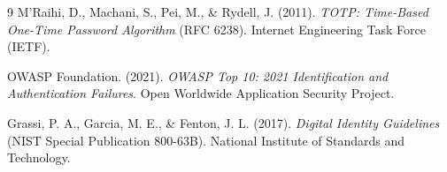 \documentclass[12pt,a4paper]{article}
\begin{document}
\vspace{1cm}
\begin{thebibliography}{9}
M'Raihi, D., Machani, S., Pei, M., \& Rydell, J. (2011). 
\textit{TOTP: Time-Based One-Time Password Algorithm} (RFC 6238). 
Internet Engineering Task Force (IETF).

OWASP Foundation. (2021). 
\textit{OWASP Top 10: 2021 Identification and Authentication Failures}. 
Open Worldwide Application Security Project.

Grassi, P. A., Garcia, M. E., \& Fenton, J. L. (2017). 
\textit{Digital Identity Guidelines} (NIST Special Publication 800-63B). 
National Institute of Standards and Technology.

\end{thebibliography}
\end{document}
